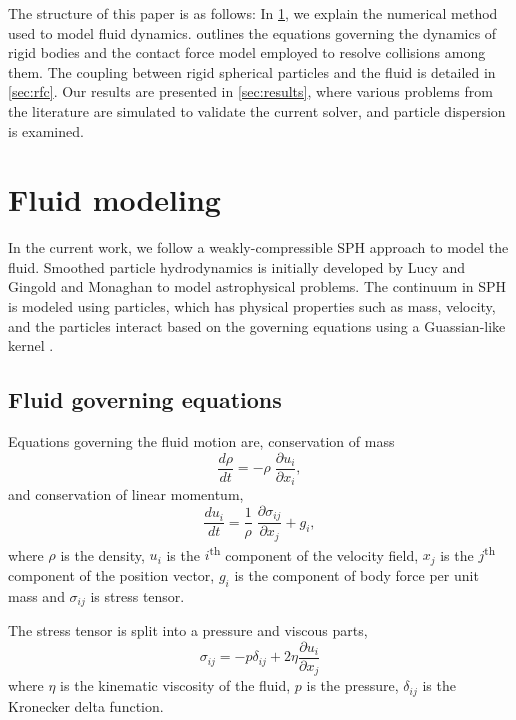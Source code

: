 \documentclass[preprint,12pt]{elsarticle}
\begin{document}
The structure of this paper is as follows: In
\cref{sec:fluid-modeling}, we explain the numerical method used to model fluid
dynamics.  outlines the equations governing the dynamics
of rigid bodies and the contact force model employed to resolve collisions
among them. The coupling between rigid spherical particles and the fluid is
detailed in \cref{sec:rfc}. Our results are presented in
\cref{sec:results}, where various problems from the literature are simulated to
validate the current solver, and particle dispersion is examined.



\FloatBarrier%
\section{Fluid modeling}
\label{sec:fluid-modeling}
In the current work, we follow a weakly-compressible SPH approach to model the
fluid. Smoothed particle hydrodynamics is initially developed by Lucy
\cite{lucy1977numerical} and Gingold and Monaghan \cite{gingold1977smoothed}
to model astrophysical problems. The continuum in SPH is modeled using
particles, which has physical properties such as mass, velocity, and the
particles interact based on the governing equations using a Guassian-like
kernel \cite{SPH_papers}.


\FloatBarrier%
\subsection{Fluid governing equations}
\label{sec:fluid--governing-equations}
Equations governing the fluid motion are, conservation of mass
\begin{equation}
  \label{eq:ce}
  \frac{d \rho}{d t} = - \rho \; \frac{\partial u_i}{\partial x_i},
\end{equation}
and conservation of linear momentum,
\begin{equation}
  \label{eq:me}
  \frac{d u_i}{d t} = \frac{1}{\rho} \; \frac{\partial \sigma_{ij}}{\partial x_j}
  + g_i,
\end{equation}
where $\rho$ is the density, $u_i$ is the $i$\textsuperscript{th} component of
the velocity field, $x_j$ is the $j$\textsuperscript{th} component of the
position vector, $g_i$ is the component of body force per unit mass and
$\sigma_{ij}$ is stress tensor.

The stress tensor is split into a pressure and viscous parts,
\begin{equation}
  \label{eq:fluid-stress-decomposition}
  \sigma_{ij} = - p \delta_{ij} + 2 \eta \frac{\partial u_i}{\partial x_j}
\end{equation}
where $\eta$ is the kinematic viscosity of the fluid, $p$ is the pressure,
$\delta_{ij}$ is the Kronecker delta function.
\end{document}
